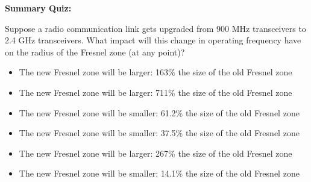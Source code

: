 \vfil \eject

\noindent
{\bf Summary Quiz:}

Suppose a radio communication link gets upgraded from 900 MHz transceivers to 2.4 GHz transceivers.  What impact will this change in operating frequency have on the radius of the Fresnel zone (at any point)?

\begin{itemize}
\item{} The new Fresnel zone will be larger: 163\% the size of the old Fresnel zone
\vskip 5pt 
\item{} The new Fresnel zone will be larger: 711\% the size of the old Fresnel zone 
\vskip 5pt 
\item{} The new Fresnel zone will be smaller: 61.2\% the size of the old Fresnel zone
\vskip 5pt 
\item{} The new Fresnel zone will be smaller: 37.5\% the size of the old Fresnel zone 
\vskip 5pt 
\item{} The new Fresnel zone will be larger: 267\% the size of the old Fresnel zone 
\vskip 5pt 
\item{} The new Fresnel zone will be smaller: 14.1\% the size of the old Fresnel zone 
\end{itemize}





